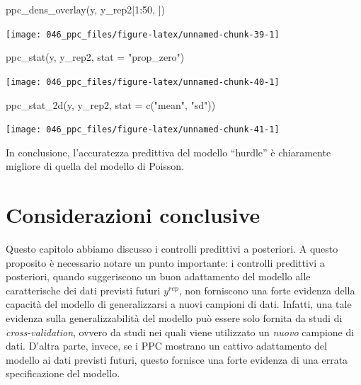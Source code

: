 \documentclass[
  11pt,
  italian,
  a4paper,
  extrafontsizes,onecolumn,openright
  ]{memoir}
\newenvironment{Shaded}{\begin{snugshade}}{\end{snugshade}}
\newcommand{\AttributeTok}[1]{\textcolor[rgb]{0.77,0.63,0.00}{#1}}
\newcommand{\DecValTok}[1]{\textcolor[rgb]{0.00,0.00,0.81}{#1}}
\newcommand{\FunctionTok}[1]{\textcolor[rgb]{0.00,0.00,0.00}{#1}}
\newcommand{\NormalTok}[1]{#1}
\newcommand{\SpecialCharTok}[1]{\textcolor[rgb]{0.00,0.00,0.00}{#1}}
\newcommand{\StringTok}[1]{\textcolor[rgb]{0.31,0.60,0.02}{#1}}
\theoremstyle{definition}
\theoremstyle{definition}
\theoremstyle{definition}
\theoremstyle{definition}
\theoremstyle{remark}
\begin{document}
\begin{Shaded}
\begin{Highlighting}[]
\FunctionTok{ppc\_dens\_overlay}\NormalTok{(y, y\_rep2[}\DecValTok{1}\SpecialCharTok{:}\DecValTok{50}\NormalTok{, ])}
\end{Highlighting}
\end{Shaded}

\begin{center}\texttt{[image: 046\_ppc\_files/figure-latex/unnamed-chunk-39-1]} \end{center}

\begin{Shaded}
\begin{Highlighting}[]
\FunctionTok{ppc\_stat}\NormalTok{(y, y\_rep2, }\AttributeTok{stat =} \StringTok{"prop\_zero"}\NormalTok{)}
\end{Highlighting}
\end{Shaded}

\begin{center}\texttt{[image: 046\_ppc\_files/figure-latex/unnamed-chunk-40-1]} \end{center}

\begin{Shaded}
\begin{Highlighting}[]
\FunctionTok{ppc\_stat\_2d}\NormalTok{(y, y\_rep2, }\AttributeTok{stat =} \FunctionTok{c}\NormalTok{(}\StringTok{"mean"}\NormalTok{, }\StringTok{"sd"}\NormalTok{))}
\end{Highlighting}
\end{Shaded}

\begin{center}\texttt{[image: 046\_ppc\_files/figure-latex/unnamed-chunk-41-1]} \end{center}

In conclusione, l'accuratezza predittiva del modello ``hurdle'' è chiaramente migliore di quella del modello di Poisson.

\hypertarget{considerazioni-conclusive}{%
\section*{Considerazioni conclusive}\label{considerazioni-conclusive}}

Questo capitolo abbiamo discusso i controlli predittivi a posteriori. A questo proposito è necessario notare un punto importante: i controlli predittivi a posteriori, quando suggeriscono un buon adattamento del modello alle caratterische dei dati previsti futuri \(y^{rep}\), non forniscono una forte evidenza della capacità del modello di generalizzarsi a nuovi campioni di dati. Infatti, una tale evidenza sulla generalizzabilità del modello può essere solo fornita da studi di \emph{cross-validation}, ovvero da studi nei quali viene utilizzato un \emph{nuovo} campione di dati. D'altra parte, invece, se i PPC mostrano un cattivo adattamento del modello ai dati previsti futuri, questo fornisce una forte evidenza di una errata specificazione del modello.
\end{document}
